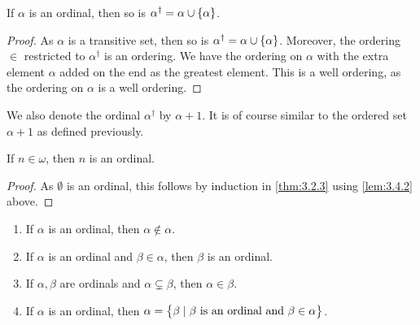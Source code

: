 \begin{lemma}
\label{lem:3.4.2}
If $ \alpha $ is an ordinal, then so is $ \alpha^\dagger = \alpha \cup \cbr{\alpha} $.
\end{lemma}

\begin{proof}
As $ \alpha $ is a transitive set, then so is $ \alpha^\dagger = \alpha \cup \cbr{\alpha} $. Moreover, the ordering $ \in $ restricted to $ \alpha^\dagger $ is an ordering. We have the ordering on $ \alpha $ with the extra element $ \alpha $ added on the end as the greatest element. This is a well ordering, as the ordering on $ \alpha $ is a well ordering.
\end{proof}

We also denote the ordinal $ \alpha^\dagger $ by $ \alpha + 1 $. It is of course similar to the ordered set $ \alpha + 1 $ as defined previously.

\begin{corollary}
If $ n \in \omega $, then $ n $ is an ordinal.
\end{corollary}

\begin{proof}
As $ \emptyset $ is an ordinal, this follows by induction in \ref{thm:3.2.3} using \ref{lem:3.4.2} above.
\end{proof}

\begin{proposition}
\label{prop:3.4.4}
\hfill
\begin{enumerate}
\item If $ \alpha $ is an ordinal, then $ \alpha \notin \alpha $.
\item If $ \alpha $ is an ordinal and $ \beta \in \alpha $, then $ \beta $ is an ordinal.
\item If $ \alpha, \beta $ are ordinals and $ \alpha \subsetneq \beta $, then $ \alpha \in \beta $.
\item If $ \alpha $ is an ordinal, then $ \alpha = \cbr{\beta \mid \beta \ \text{is an ordinal and} \ \beta \in \alpha} $.
\end{enumerate}
\end{proposition}

